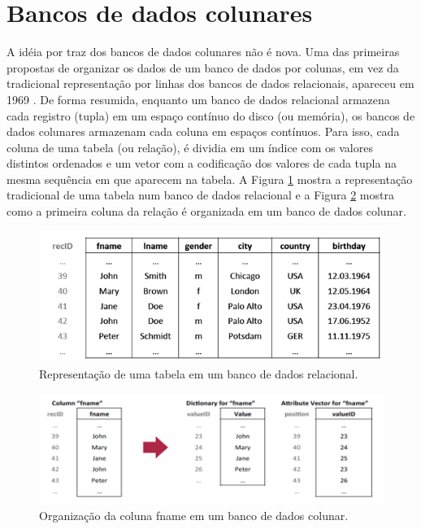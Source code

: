 \section{Bancos de dados colunares} \label{colunar}
A idéia por traz dos bancos de dados colunares não é nova. Uma das primeiras propostas de organizar os dados de um banco de dados por colunas, em vez da tradicional representação por linhas dos bancos de dados relacionais, apareceu em 1969 \cite{Estabrook1969327}. De forma resumida, enquanto um banco de dados relacional armazena cada registro (tupla) em um espaço contínuo do disco (ou memória), os bancos de dados colunares armazenam cada coluna em espaços contínuos. Para isso, cada coluna de uma tabela (ou relação), é dividia em um índice com os valores distintos ordenados e um vetor com a codificação dos valores de cada tupla na mesma sequência em que aparecem na tabela. A Figura \ref{fig:tabular} mostra a representação tradicional de uma tabela num banco de dados relacional e a Figura \ref{fig:colunar} mostra como a primeira coluna da relação é organizada em um banco de dados colunar.

\begin{figure}
	\centering
	\includegraphics[width=\linewidth]{./colunar_repr_tabela.png}
	\caption{Representação de uma tabela em um banco de dados relacional.}
	\label{fig:tabular}
\end{figure}

\begin{figure}
	\centering
	\includegraphics[width=\linewidth]{./colunar_repr_coluna.png}
	\caption{Organização da coluna fname em um banco de dados colunar.}
	\label{fig:colunar}
\end{figure}

